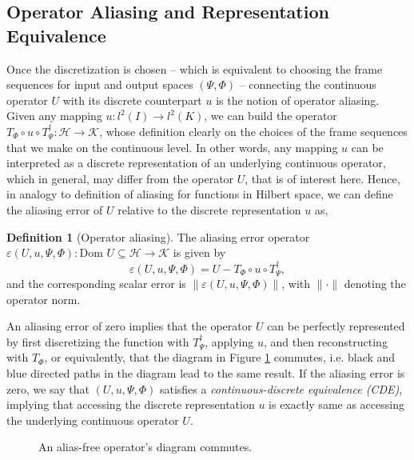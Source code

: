 \documentclass[reqno,10pt]{amsart}
\theoremstyle{plain}
\theoremstyle{definition}
\newtheorem{defn}{Definition}
\newcommand{\cal}[1]{\mathcal{#1}}
\begin{document}
    \subsection{\bf Operator Aliasing and Representation Equivalence}
    Once the discretization is chosen -- which is equivalent to choosing the frame sequences for input and output spaces $(\Psi,\Phi)$ -- connecting the continuous operator $U$ with its discrete counterpart $u$ is the notion of operator aliasing. Given any mapping $u : l^2(I) \to l^2(K)$, we can build the operator $T_\Phi \circ u \circ T_\Psi^\dag : \cal H \to \cal K$, whose definition clearly on the choices of the frame sequences that we make on the continuous level. In other words, any mapping $u$ can be interpreted as a discrete representation of an underlying continuous operator, which in general, may differ from the operator $U$, that is of interest here. Hence, in analogy to definition of aliasing for functions in Hilbert space, we can define the aliasing error of $U$ relative to the discrete representation $u$ as,
    \begin{defn}[Operator aliasing]\label{def:opalias}
        The aliasing error operator $\varepsilon(U,u,\Psi,\Phi):\text{Dom }U \subseteq \cal H \to \cal K$ is given by
        $$ \varepsilon(U,u,\Psi,\Phi) = U - T_\Phi \circ u \circ T_\Psi^\dag,$$
        and the corresponding scalar error is $\|\varepsilon(U, u, \Psi, \Phi)\|$, with $\|\cdot\|$ denoting the operator norm.
    \end{defn}
    \noindent An aliasing error of zero implies that the operator $U$ can be perfectly represented by first discretizing the function with $T_\Psi^\dag$, applying $u$, and then reconstructing with $T_\Phi$, or equivalently, that the diagram in Figure \ref{fig:1} commutes, i.e. black and blue directed paths in the diagram lead to the same result. If the aliasing error is zero, we say that $(U, u, \Psi, \Phi)$ satisfies a {\it continuous-discrete equivalence (CDE)}, implying that accessing the discrete representation $u$ is exactly same as accessing the underlying continuous operator $U$.
    \begin{figure}[!ht] \label{fig:1}
        \caption{An alias-free operator's diagram commutes.}
    \end{figure}
\end{document}
